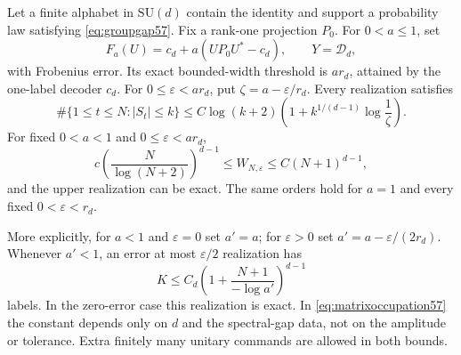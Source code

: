 \begin{theorem}\label{thm:matrixwidth57}
Let a finite alphabet in $\mathrm{SU}(d)$ contain the identity and support a probability law satisfying \eqref{eq:groupgap57}. Fix a rank-one projection $P_0$. For $0<a\le1$, set
\begin{equation}\label{eq:matrixexperiment57}
 F_a(U)=c_d+a(UP_0U^*-c_d),\qquad Y=\mathcal D_d,
\end{equation}
with Frobenius error. Its exact bounded-width threshold is $a r_d$, attained by the one-label decoder $c_d$. For $0\le\varepsilon<a r_d$, put $\zeta=a-\varepsilon/r_d$. Every realization satisfies
\begin{equation}\label{eq:matrixoccupation57}
 \#\{1\le t\le N:|S_t|\le k\}
 \le C\log(k+2)\left(1+k^{1/(d-1)}\log\frac1\zeta\right).
\end{equation}
For fixed $0<a<1$ and $0\le\varepsilon<a r_d$,
\begin{equation}\label{eq:matrixrate57}
 c\left(\frac{N}{\log(N+2)}\right)^{d-1}
            \le W_{N,\varepsilon}\le C(N+1)^{d-1},
\end{equation}
and the upper realization can be exact. The same orders hold for $a=1$ and every fixed $0<\varepsilon<r_d$.

More explicitly, for $a<1$ and $\varepsilon=0$ set $a'=a$; for $\varepsilon>0$ set $a'=a-\varepsilon/(2r_d)$. Whenever $a'<1$, an error at most $\varepsilon/2$ realization has
\begin{equation}\label{eq:matrixupper57}
 K\le C_d\left(1+\frac{N+1}{-\log a'}\right)^{d-1}
\end{equation}
labels. In the zero-error case this realization is exact. In \eqref{eq:matrixoccupation57} the constant depends only on $d$ and the spectral-gap data, not on the amplitude or tolerance. Extra finitely many unitary commands are allowed in both bounds.
\end{theorem}
